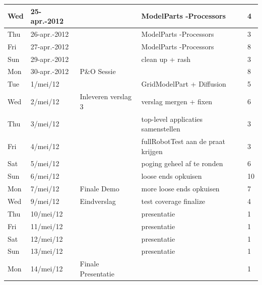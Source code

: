 \documentclass[12pt,a4paper]{report}
\begin{document}
\begin{landscape}
\begin{longtable}{llp{7cm}p{10cm}l}
\hline
Wed & 25-apr.-2012 &  & ModelParts  -Processors & 4 \\ 
\hline
Thu & 26-apr.-2012 &  & ModelParts  -Processors & 3 \\ 
\hline
Fri & 27-apr.-2012 &  & ModelParts  -Processors & 8 \\ 
\hline
Sun & 29-apr.-2012 &  & clean up + rash & 3 \\ 
\hline
Mon & 30-apr.-2012 & P\&O Sessie &  & 8 \\ 
\hline
Tue & 1/mei/12 &  & GridModelPart + Diffusion & 5 \\ 
\hline
Wed & 2/mei/12 & Inleveren verslag 3 & verslag mergen + fixen & 6 \\ 
\hline
Thu & 3/mei/12 &  & top-level applicaties samenstellen & 3 \\ 
\hline
Fri & 4/mei/12 &  & fullRobotTest aan de praat krijgen & 3 \\ 
\hline
Sat & 5/mei/12 &  & poging geheel af te ronden & 6 \\ 
\hline
Sun & 6/mei/12 &  & loose ends opkuisen & 10 \\ 
\hline
Mon & 7/mei/12 & Finale Demo & more loose ends opkuisen & 7 \\ 
\hline
Wed & 9/mei/12 & Eindverslag & test coverage finalize & 4  \\ 
\hline
Thu & 10/mei/12 &  & presentatie & 1 \\ 
\hline
Fri & 11/mei/12 &  & presentatie & 1 \\ 
\hline
Sat & 12/mei/12 &  & presentatie & 1 \\ 
\hline
Sun & 13/mei/12 &  & presentatie & 1 \\ 
\hline
Mon & 14/mei/12 & Finale Presentatie &  & 1 \\ 
\hline


\end{longtable}
\normalsize

\end{landscape}




\end{document}
